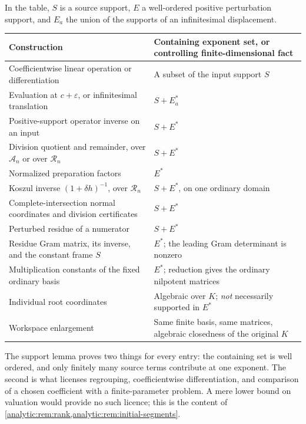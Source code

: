 \documentclass[11pt,letterpaper]{article}
\theoremstyle{definition}
\theoremstyle{remark}
\newcommand{\A}{\mathscr A}
\newcommand{\RR}{\mathscr R}
\numberwithin{equation}{section}
\begin{document}
In the table, $S$ is a source support, $E$ a well-ordered positive
perturbation support, and $E_a$ the union of the supports of an
infinitesimal displacement.

\begin{center}\small
\begin{longtable}{@{}L{0.40\textwidth}L{0.52\textwidth}@{}}
\toprule
Construction & Containing exponent set, or controlling finite-dimensional
fact\\
\midrule
\endhead
Coefficientwise linear operation or differentiation & A subset of the input
support $S$\\[0.35em]
Evaluation at $c+\varepsilon$, or infinitesimal translation &
$S+E_a^*$\\[0.35em]
Positive-support operator inverse on an input & $S+E^*$\\[0.35em]
Division quotient and remainder, over $\A_n$ or over $\RR_n$ &
$S+E^*$\\[0.35em]
Normalized preparation factors & $E^*$\\[0.35em]
Koszul inverse $(1+\delta h)^{-1}$, over $\RR_n$ & $S+E^*$, on one ordinary
domain\\[0.35em]
Complete-intersection normal coordinates and division certificates &
$S+E^*$\\[0.35em]
Perturbed residue of a numerator & $S+E^*$\\[0.35em]
Residue Gram matrix, its inverse, and the constant frame $S$ & $E^*$; the
leading Gram determinant is nonzero\\[0.35em]
Multiplication constants of the fixed ordinary basis & $E^*$; reduction
gives the ordinary nilpotent matrices\\[0.35em]
Individual root coordinates & Algebraic over $K$; \emph{not} necessarily
supported in $E^*$\\[0.35em]
Workspace enlargement & Same finite basis, same matrices, algebraic
closedness of the original $K$\\
\bottomrule
\end{longtable}
\end{center}

The support lemma proves two things for every entry: the containing set is
well ordered, and only finitely many source terms contribute at one
exponent. The second is what licenses regrouping, coefficientwise
differentiation, and comparison of a chosen coefficient with a
finite-parameter problem. A mere lower bound on valuation would provide no
such licence; this is the content of
\cref{analytic:rem:rank,analytic:rem:initial-segments}.
\end{document}

